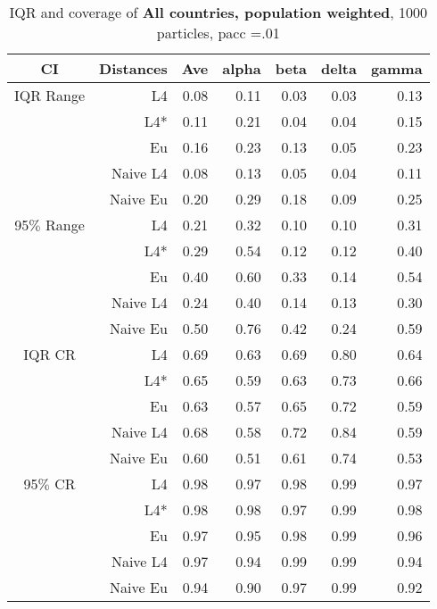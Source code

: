 \documentclass[a4paper,12pt,twoside]{book}
\begin{document}
\begin{table}[H]
\centering
\caption{IQR and coverage of \textbf{All countries, population weighted}, 1000 particles, pacc =.01}

\begin{tabular}{crrrrrr}
  \hline
{\color{blue}CI} & Distances & Ave & alpha & beta & delta & gamma \\ 
  \hline
{\color{blue}IQR Range} & L4  &0.08 & 0.11 & 0.03 & 0.03 & 0.13 \\ 
 
&L4*  & 0.11 & 0.21 & 0.04 & 0.04 & 0.15 \\ 
  
&Eu &    0.16 & 0.23 & 0.13 & 0.05 & 0.23 \\ 
 
&Naive L4&  0.08 & 0.13 & 0.05 & 0.04 & 0.11 \\ 
&Naive Eu &  0.20 & 0.29 & 0.18 & 0.09 & 0.25 \\ 
 
    {\color{blue}95$\%$ Range} & L4  &0.21 & 0.32 & 0.10 & 0.10 & 0.31 \\ 
  
    &L4*  &  0.29 & 0.54 & 0.12 & 0.12 & 0.40 \\ 
 
&Eu &    0.40 & 0.60 & 0.33 & 0.14 & 0.54 \\ 
 
&Naive L4&   0.24 & 0.40 & 0.14 & 0.13 & 0.30 \\  
 
&Naive Eu &    0.50 & 0.76 & 0.42 & 0.24 & 0.59 \\ 
  
   \hline
   
{\color{blue} IQR CR } & L4  &0.69 & 0.63 & 0.69 & 0.80 & 0.64 \\ 
 

&L4*  &   0.65 & 0.59 & 0.63 & 0.73 & 0.66 \\ 
 
 
&Eu &     0.63 & 0.57 & 0.65 & 0.72 & 0.59 \\ 
  
  
&Naive L4& 0.68 & 0.58 & 0.72 & 0.84 & 0.59 \\ 
&Naive Eu &  0.60 & 0.51 & 0.61 & 0.74 & 0.53 \\ 
  

 {\color{blue} 95$\%$ CR }& L4  &0.98 & 0.97 & 0.98 & 0.99 & 0.97 \\ 
  
 
  &L4*  &    0.98 & 0.98 & 0.97 & 0.99 & 0.98 \\ 
 
&Eu &    0.97 & 0.95 & 0.98 & 0.99 & 0.96 \\ 
  
&Naive L4&   0.97 & 0.94 & 0.99 & 0.99 & 0.94 \\ 
 
&Naive Eu &     0.94 & 0.90 & 0.97 & 0.99 & 0.92 \\ 
 
\end{tabular}

\end{table}
\end{document}
